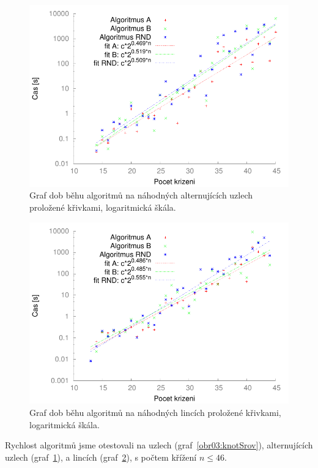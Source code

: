 \begin{figure}[p]\centering
\includegraphics{../img/alt_knotsFIT}
\caption{Graf dob běhu algoritmů na náhodných alternujících uzlech proložené křivkami, logaritmická škála.}
\label{obr03:altSrov}
\end{figure}

\begin{figure}[p]\centering
\includegraphics{../img/linksFIT}
\caption{Graf dob běhu algoritmů na náhodných lincích proložené křivkami, logaritmická škála.}
\label{obr03:linkSrov}
\end{figure}

Rychlost algoritmů jsme otestovali na uzlech (graf~\ref{obr03:knotSrov}), alternujících uzlech (graf~\ref{obr03:altSrov}), a lincích (graf~\ref{obr03:linkSrov}), s počtem křížení $n \leq 46$. 

